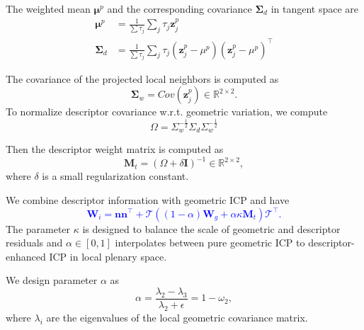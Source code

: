 The weighted mean $\bm{\mu}^{p}$ and the corresponding covariance $\bm{\Sigma}_d$ in tangent space are
\begin{equation}
    \begin{split}
        \bm{\mu}^{p}  &= \frac{1}{\sum \tau_j} \sum_j \tau_j \mathbf{z}_j^{p} \\
        \bm{\Sigma}_d &= \frac{1}{\sum \tau_j} \sum_j \tau_j (\mathbf{z}_j^{p}-\mu^{p})(\mathbf{z}_j^{p}-\mu^{p})^{\top}  
    \end{split}
\end{equation}

The covariance of the projected local neighbors is computed as 
\begin{equation}
            \bm{\Sigma}_{w} = Cov(\mathbf{z}_j^{p}) \in \mathbb{R}^{2\times2}.
\end{equation}
To normalize descriptor covariance w.r.t. geometric variation, we compute
\begin{equation}
    \Omega = \Sigma_w^{-\frac{1}{2}} \Sigma_d \Sigma_w^{-\frac{1}{2}}
\end{equation}



Then the descriptor weight matrix is computed as
\begin{equation}
    \mathbf{M}_t = \left(\Omega + \delta \mathbf{I}\right)^{-1} \in \mathbb{R}^{2\times 2},
\end{equation}
where $\delta$ is a small regularization constant.

We combine descriptor information with geometric ICP and have
\textcolor{blue}{
\begin{equation}
    \mathbf{W}_i = \mathbf{n}\mathbf{n}^{\top} + \mathcal{T}\left((1-\alpha) \mathbf{W}_g + \alpha\kappa \mathbf{M}_t\right) \mathcal{T}^{\top}.
\end{equation}
}
The parameter $\kappa$ is designed to balance the scale of geometric and descriptor residuals and $\alpha \in [0,1]$ interpolates between pure geometric ICP to descriptor-enhanced ICP in local plenary space. 

We design parameter $\alpha$ as
\begin{equation}
    \alpha = \frac{\lambda_2 - \lambda_3}{\lambda_2 +\epsilon} = 1 - \omega_2,
\end{equation}
where $\lambda_i$ are the eigenvalues of the local geometric covariance matrix. 

